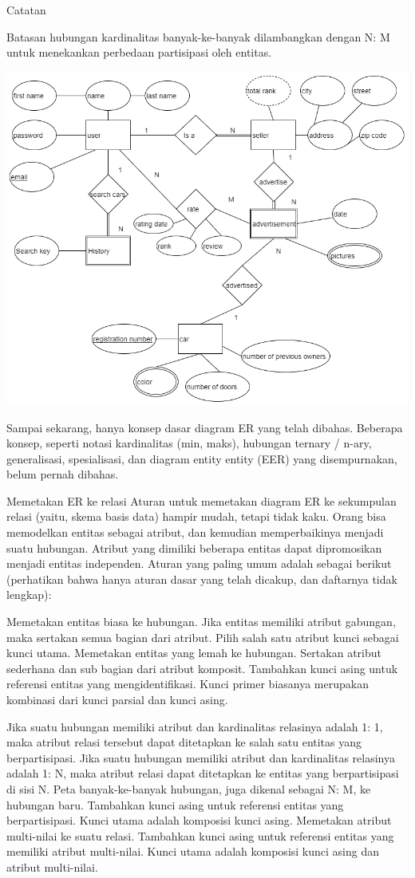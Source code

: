 \documentclass[]{book}
\begin{document}
Catatan

Batasan hubungan kardinalitas banyak-ke-banyak dilambangkan dengan N: M untuk menekankan perbedaan partisipasi oleh entitas.

\begin{center}\includegraphics[width=0.7\linewidth]{img/01/db_model3} \end{center}

Sampai sekarang, hanya konsep dasar diagram ER yang telah dibahas. Beberapa konsep, seperti notasi kardinalitas (min, maks), hubungan ternary / n-ary, generalisasi, spesialisasi, dan diagram entity entity (EER) yang disempurnakan, belum pernah dibahas.

Memetakan ER ke relasi Aturan untuk memetakan diagram ER ke sekumpulan relasi (yaitu, skema basis data) hampir mudah, tetapi tidak kaku. Orang bisa memodelkan entitas sebagai atribut, dan kemudian memperbaikinya menjadi suatu hubungan. Atribut yang dimiliki beberapa entitas dapat dipromosikan menjadi entitas independen. Aturan yang paling umum adalah sebagai berikut (perhatikan bahwa hanya aturan dasar yang telah dicakup, dan daftarnya tidak lengkap):

Memetakan entitas biasa ke hubungan. Jika entitas memiliki atribut gabungan, maka sertakan semua bagian dari atribut. Pilih salah satu atribut kunci sebagai kunci utama. Memetakan entitas yang lemah ke hubungan. Sertakan atribut sederhana dan sub bagian dari atribut komposit. Tambahkan kunci asing untuk referensi entitas yang mengidentifikasi. Kunci primer biasanya merupakan kombinasi dari kunci parsial dan kunci asing.

Jika suatu hubungan memiliki atribut dan kardinalitas relasinya adalah 1: 1, maka atribut relasi tersebut dapat ditetapkan ke salah satu entitas yang berpartisipasi. Jika suatu hubungan memiliki atribut dan kardinalitas relasinya adalah 1: N, maka atribut relasi dapat ditetapkan ke entitas yang berpartisipasi di sisi N. Peta banyak-ke-banyak hubungan, juga dikenal sebagai N: M, ke hubungan baru. Tambahkan kunci asing untuk referensi entitas yang berpartisipasi. Kunci utama adalah komposisi kunci asing. Memetakan atribut multi-nilai ke suatu relasi. Tambahkan kunci asing untuk referensi entitas yang memiliki atribut multi-nilai. Kunci utama adalah komposisi kunci asing dan atribut multi-nilai.
\end{document}
